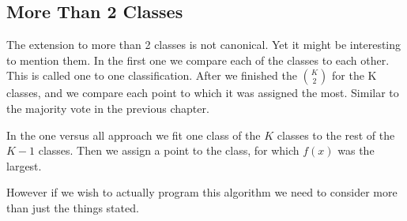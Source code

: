 \documentclass{article}
\begin{document}
\subsection{More Than 2 Classes}

The extension to more than 2 classes is not canonical. Yet it might be interesting to mention them. In the first one we compare each of the classes to each other. This is called one to one classification. After we finished the $\binom{K}{2}$ for the K classes, and we compare each point to which it was assigned the most. Similar to the majority vote in the previous chapter.

In the one versus all approach we fit one class of the $K$ classes to the rest of the $K-1$ classes. Then we assign a point to the class, for which $f(x)$ was the largest. 

However if we wish to actually program this algorithm we need to consider more than just the things stated. 


\newpage


\end{document}
